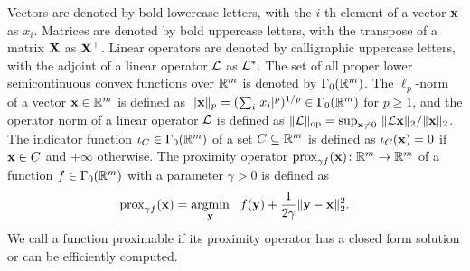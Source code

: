 Vectors are denoted by bold lowercase letters, with the $i$-th element of a vector $\mathbf{x}$ as $x_i$.
Matrices are denoted by bold uppercase letters, with the transpose of a matrix $\mathbf{X}$ as $\mathbf{X}^{\top}$.
Linear operators are denoted by calligraphic uppercase letters, with the adjoint of a linear operator $\mathcal{L}$ as $\mathcal{L}^{\ast}$.
The set of all proper lower semicontinuous convex functions over $\mathbb{R}^{m}$ is denoted by $\Gamma_0 (\mathbb{R}^{m})$.
The $\ell_p$-norm of a vector $\mathbf{x} \in \mathbb{R}^{m}$ is defined as $\lVert \mathbf{x} \rVert_p = (\sum\nolimits_{i} \lvert x_i \rvert^p)^{1/p} \in \Gamma_0 (\mathbb{R}^{m})$ for $p \geq 1$, and the operator norm of a linear operator $\mathcal{L}$ is defined as $\lVert \mathcal{L} \rVert_\text{op} = \sup_{\mathbf{x} \neq 0} \  \lVert \mathcal{L} \mathbf{x} \rVert_2 / \lVert \mathbf{x} \rVert_2$.
The indicator function $\iota_{C} \in \Gamma_0 (\mathbb{R}^{m})$ of a set $C \subseteq \mathbb{R}^{m}$ is defined as $\iota_{C}(\mathbf{x}) = 0$ if $\mathbf{x} \in C$ and $+\infty$ otherwise.
The proximity operator ${\operatorname{prox}_{\gamma f} ({\mathbf{x}})} \colon {\mathbb{R}^{m}} \to {\mathbb{R}^{m}}$ of a function $f \in \Gamma_0 (\mathbb{R}^{m})$ with a parameter $\gamma > 0$ is defined as
\begin{equation}
    \operatorname{prox}_{\gamma f} ({\mathbf{x}}) = \mathop{\mathrm{argmin}}\limits_{\mathbf{y}} \ \  f (\mathbf{y}) + \frac{1}{2 \gamma} \lVert \mathbf{y} - \mathbf{x} \rVert_2^2.
\end{equation}
We call a function proximable if its proximity operator has a closed form solution or can be efficiently computed.
